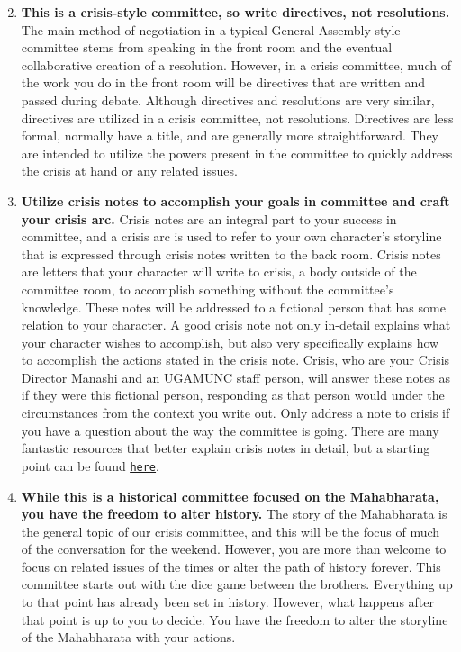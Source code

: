 \documentclass[10pt, letterpaper]{article}
\begin{document}
\begin{enumerate}

\setcounter{enumi}{1}
\item
  
  \textbf{This is a crisis-style committee, so write directives, not
  resolutions.} The main method of negotiation in a typical General
  Assembly-style committee stems from speaking in the front room and the
  eventual collaborative creation of a resolution. However, in a crisis
  committee, much of the work you do in the front room will be
  directives that are written and passed during debate. Although
  directives and resolutions are very similar, directives are utilized
  in a crisis committee, not resolutions. Directives are less formal,
  normally have a title, and are generally more straightforward. They
  are intended to utilize the powers present in the committee to quickly
  address the crisis at hand or any related issues.
  
\item
  
  \textbf{Utilize crisis notes to accomplish your goals in committee and
  craft your crisis arc.} Crisis notes are an integral part to your
  success in committee, and a crisis arc is used to refer to your own
  character's storyline that is expressed through crisis notes written
  to the back room. Crisis notes are letters that your character will
  write to crisis, a body outside of the committee room, to accomplish
  something without the committee's knowledge. These notes will be
  addressed to a fictional person that has some relation to your
  character. A good crisis note not only in-detail explains what your
  character wishes to accomplish, but also very specifically explains
  how to accomplish the actions stated in the crisis note. Crisis, who
  are your Crisis Director Manashi and an UGAMUNC staff person, will
  answer these notes as if they were this fictional person, responding
  as that person would under the circumstances from the context you
  write out. Only address a note to crisis if you have a question about
  the way the committee is going. There are many fantastic resources
  that better explain crisis notes in detail, but a starting point can
  be found \texttt{\href{http://bestdelegate.com/the-three-crisis-notes-to-send-at-the-beginning-of-any-model-un-crisis-committee/}{\underline{here}}}.
  
\item
  
  \textbf{While this is a historical committee focused on the
  Mahabharata, you have the freedom to alter history.} The story of the
  Mahabharata is the general topic of our crisis committee, and this
  will be the focus of much of the conversation for the weekend.
  However, you are more than welcome to focus on related issues of the
  times or alter the path of history forever. This committee starts out
  with the dice game between the brothers. Everything up to that point
  has already been set in history. However, what happens after that
  point is up to you to decide. You have the freedom to alter the
  storyline of the Mahabharata with your actions.
  

\end{enumerate}
\end{document}
